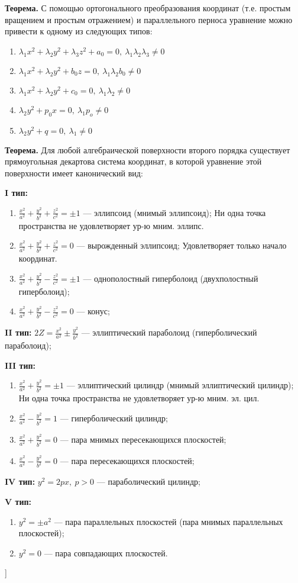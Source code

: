 \textbf{Теорема.} С помощью ортогонального преобразования координат (т.е. простым вращением и простым отражением) и параллельного перноса уравнение можно привести к одному из следующих типов:
\begin{enumerate}
    \item $\lambda_1x^2 + \lambda_2y^2 +\lambda_3z^2 + a_0 = 0, \ \lambda_1 \lambda_2 \lambda_3 \neq 0$
    \item $\lambda_1x^2 + \lambda_2y^2 + b_0z = 0, \ \lambda_1 \lambda_2 b_0 \neq 0$
    \item $\lambda_1x^2 + \lambda_2y^2 + c_0 = 0, \ \lambda_1 \lambda_2 \neq 0$
    \item $\lambda_2y^2 + p_0x = 0 , \ \lambda_1 p_o \neq 0$
    \item $\lambda_2y^2 + q = 0, \ \lambda_1 \neq 0$
\end{enumerate}


\textbf{Теорема.} Для любой алгебраической поверхности второго порядка существует прямоугольная декартова система координат, в которой уравнение этой поверхности имеет канонический вид:

\textbf{I тип:}
\begin{enumerate}
    \item $\frac{x^2}{a^2} + \frac{y^2}{b^2} + \frac{z^2}{c^2} = \pm1$ --- эллипсоид (мнимый эллипсоид); Ни одна точка пространства не удовлетворяет ур-ю мним. эллипс.
    \item $\frac{x^2}{a^2} + \frac{y^2}{b^2} + \frac{z^2}{c^2} = 0$ --- вырожденный эллипсоид; Удовлетворяет только начало координат.
    \item $\frac{x^2}{a^2} + \frac{y^2}{b^2} - \frac{z^2}{c^2} = \pm1$ --- однополостный гиперболоид (двухполостный гиперболоид);
    \item $\frac{x^2}{a^2} + \frac{y^2}{b^2} - \frac{z^2}{c^2} = 0$ --- конус;
\end{enumerate}

\textbf{II тип:}
 $ 2 Z = \frac{x^2}{a^2} \pm \frac{y^2}{b^2}$ --- эллиптический параболоид (гиперболический параболоид);

\textbf{III тип:}
\begin{enumerate}
    \item $\frac{x^2}{a^2} + \frac{y^2}{b^2} = \pm1$ --- эллиптический цилиндр (мнимый эллиптический цилиндр); Ни одна точка пространства не удовлетворяет ур-ю мним. эл. цил.
    \item $\frac{x^2}{a^2} - \frac{y^2}{b^2} = 1$ --- гиперболический цилиндр;
    \item $\frac{x^2}{a^2} + \frac{y^2}{b^2} = 0$ --- пара мнимых пересекающихся плоскостей;
    \item $\frac{x^2}{a^2} - \frac{y^2}{b^2} = 0$ --- пара пересекающихся плоскостей;
\end{enumerate}
\textbf{IV тип:} $y^2 = 2px,~p > 0$ --- параболический цилиндр;

\textbf{V тип:}
\begin{enumerate}
    \item $y^2 = \pm a^2$ --- пара параллельных плоскостей (пара мнимых параллельных плоскостей);
    \item $y^2 = 0$ --- пара совпадающих плоскостей.
\end{enumerate}


\bigbreak
[\cite[page 192-200, 329-341]{kim}]